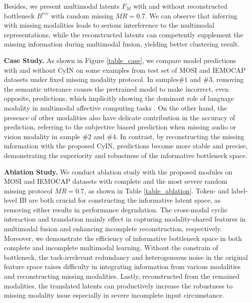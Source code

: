 \documentclass{article}
\begin{document}
Besides, we present multimodal latents $F_M$ with and without reconstructed bottleneck $B^{rec}$ with random missing $MR=0.7$. We can observe that inferring with missing modalities leads to serious interference to the multimodal representations, while the reconstructed latents can competently supplement the missing information during multimodal fusion, yielding better clustering result. 

\textbf{Case Study.}
As shown in Figure \ref{table_case}, we compare model predictions with and without CyIN on some examples from test set of MOSI and IEMOCAP datasets under fixed missing modality protocol. In samples$ \#1$ and $\#3$, removing the semantic utterance causes the pretrained model to make incorrect, even opposite, predictions, which implicitly showing the dominant role of language modality in multimodal affective computing tasks \cite{pham2019found,hazarika2020misa,lin2023dynamically,zhang2024towards}. On the other hand, the presence of other modalities also have delicate contribution in the accuracy of prediction, referring to the subjective biased prediction when missing audio or vision modality in sample $\#2$ and $\#4$. In contrast, by reconstructing the missing information with the proposed CyIN, predictions become more stable and precise, demonstrating the superiority and robustness of the informative bottleneck space.

\textbf{Ablation Study.} We conduct ablation study with the proposed modules on MOSI and IEMOCAP datasets with complete and the most severe random missing protocol $MR=0.7$, as shown in Table \ref{table_ablation}. Token- and label-level IB are both crucial for constructing the informative latent space, as removing either results in performance degradation. The cross-modal cyclic interaction and translation mainly effect in capturing modality-shared features in multimodal fusion and enhancing incomplete reconstruction, respectively. Moreover, we demonstrate the efficiency of informative bottleneck space in both complete and incomplete multimodal learning. Without the constrain of bottleneck, the task-irrelevant redundancy and heterogeneous noise in the original feature space raises difficulty in integrating information from various modalities and reconstructing missing modalities. Lastly, reconstructed from the remained modalities, the translated latents can productively increase the robustness to missing modality issue especially in severe incomplete input circumstance.
\end{document}
